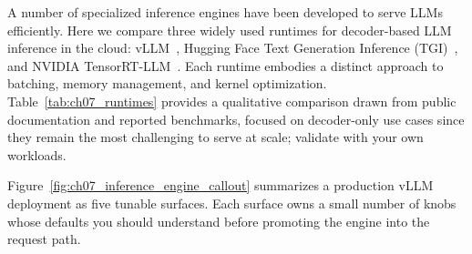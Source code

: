 A number of specialized inference engines have been developed to serve LLMs efficiently. Here we compare three widely used runtimes for decoder-based LLM inference in the cloud: vLLM~\cite{Kwon2023vLLM}, Hugging Face Text Generation Inference (TGI)~\cite{tgi-whitepaper}, and NVIDIA TensorRT-LLM~\cite{tensorrt-llm}. Each runtime embodies a distinct approach to batching, memory management, and kernel optimization. Table~\ref{tab:ch07_runtimes} provides a qualitative comparison drawn from public documentation and reported benchmarks, focused on decoder-only use cases since they remain the most challenging to serve at scale; validate with your own workloads.

Figure~\ref{fig:ch07_inference_engine_callout} summarizes a production vLLM deployment as five tunable surfaces. Each surface owns a small number of knobs whose defaults you should understand before promoting the engine into the request path.

